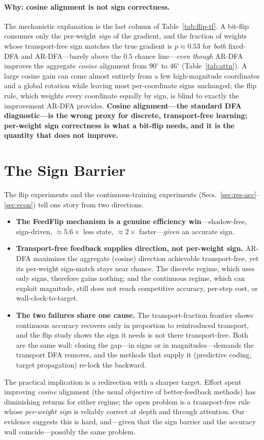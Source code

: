 \documentclass[11pt]{article}
\newcommand{\ARDFA}{\textsc{AR-DFA}}
\begin{document}
\paragraph{Why: cosine alignment is not sign correctness.} The mechanistic explanation is the last column of Table~\ref{tab:flip-tf}. A bit-flip consumes only the per-weight \emph{sign} of the gradient, and the fraction of weights whose transport-free sign matches the true gradient is $p\!\approx\!0.53$ for \emph{both} fixed-DFA and \ARDFA{}---barely above the $0.5$ chance line---\emph{even though} \ARDFA{} improves the aggregate \emph{cosine} alignment from $90^{\circ}$ to $46^{\circ}$ (Table~\ref{tab:attn}). A large cosine gain can come almost entirely from a few high-magnitude coordinates and a global rotation while leaving most per-coordinate signs unchanged; the flip rule, which weights every coordinate equally by sign, is blind to exactly the improvement \ARDFA{} provides. \textbf{Cosine alignment---the standard DFA diagnostic---is the wrong proxy for discrete, transport-free learning; per-weight sign correctness is what a bit-flip needs, and it is the quantity that does not improve.}

\section{The Sign Barrier}\label{sec:gap}
The flip experiments and the continuous-training experiments (Secs.~\ref{sec:res-acc}--\ref{sec:econ}) tell one story from two directions.
\begin{itemize}[leftmargin=*,itemsep=2pt]
  \item \textbf{The FeedFlip mechanism is a genuine efficiency win}---shadow-free, sign-driven, $\approx\!5.6\times$ less state, $\approx\!2\times$ faster---\emph{given} an accurate sign.
  \item \textbf{Transport-free feedback supplies direction, not per-weight sign.} \ARDFA{} maximizes the aggregate (cosine) direction achievable transport-free, yet its per-weight sign-match stays near chance. The discrete regime, which uses only signs, therefore gains nothing; and the continuous regime, which can exploit magnitude, still does not reach competitive accuracy, per-step cost, or wall-clock-to-target.
  \item \textbf{The two failures share one cause.} The transport-fraction frontier shows continuous accuracy recovers only in proportion to reintroduced transport, and the flip study shows the sign it needs is not there transport-free. Both are the same wall: closing the gap---in signs or in magnitudes---demands the transport DFA removes, and the methods that supply it (predictive coding, target propagation) re-lock the backward.
\end{itemize}
The practical implication is a redirection with a sharper target. Effort spent improving \emph{cosine} alignment (the usual objective of better-feedback methods) has diminishing returns for either regime; the open problem is a transport-free rule whose \emph{per-weight sign} is reliably correct at depth and through attention. Our evidence suggests this is hard, and---given that the sign barrier and the accuracy wall coincide---possibly the same problem.
\end{document}
